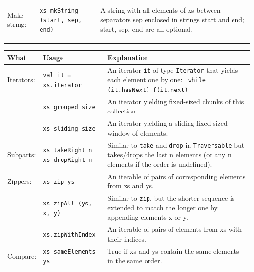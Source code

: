 \documentclass[article, a5paper]{memoir}
\newcommand{\LangColor}{red}
\newcommand{\head}[1]{{\bfseries {\color{\LangColor}{#1}}\par\vspace{1mm}\hrule\vspace{-2mm}}}
\renewcommand{\arraystretch}{0.9}
\newcommand{\Newline}{\vspace{\baselineskip}}
\begin{document}
{{\begin{tabular}{@{}l p{3.5cm} p{6.8cm}}
   Make string: & \texttt{xs mkString (start, sep, end)} & A string with all elements of xs between separators sep enclosed in strings start and end; start, sep, end are all optional.\\ \cline{1-3}

   
\end{tabular}
}

\clearpage

\head{Methods in trait \texttt{Iterable[A]}}\Newline

{\small\renewcommand{\arraystretch}{1.1}
\begin{tabular}{@{}l p{3.4cm} p{6.8cm}}

\textbf{What} & \textbf{Usage} & \textbf{Explanation} \\ \hline

  Iterators: & \texttt{val it = xs.iterator} & An iterator \texttt{it} of type \texttt{Iterator} that yields each element one by one: \texttt{ while (it.hasNext) f(it.next)}\\   \cline{2-3}

   & \texttt{xs grouped size} & An iterator yielding fixed-sized chunks of this collection.\\\cline{2-3}
   & \texttt{xs sliding size} & An iterator yielding a sliding fixed-sized window of elements.\\\cline{1-3}

  Subparts: & \texttt{xs takeRight n \newline xs dropRight n} & Similar to \texttt{take} and \texttt{drop} in \texttt{Traversable} but takes/drops the last n elements (or any n elements if the order is undefined).\\   \cline{1-3}

  Zippers: & \texttt{xs zip ys} &  	An iterable of pairs of corresponding elements from xs and ys.\\   \cline{2-3}
   & \texttt{xs zipAll (ys, x, y)} & Similar to \texttt{zip}, but the shorter sequence is extended to match the longer one by appending elements x or y.\\\cline{2-3}
   & \texttt{xs.zipWithIndex} & An iterable of pairs of elements from xs with their indices.\\\cline{1-3}

  Compare: & \texttt{xs sameElements ys} & True if xs and ys contain the same elements in the same order.\\   \cline{1-3}

        
\end{tabular}
}  

}
\end{document}
